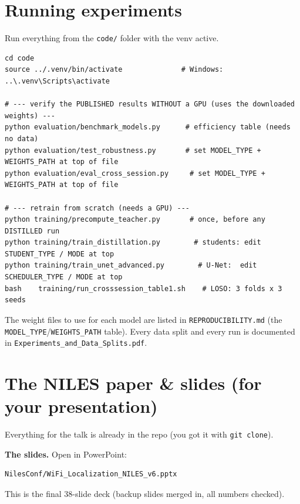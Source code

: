 \documentclass[11pt]{article}
\begin{document}
\section{Running experiments}
Run everything from the \texttt{code/} folder with the venv active.
\begin{lstlisting}
cd code
source ../.venv/bin/activate              # Windows: ..\.venv\Scripts\activate

# --- verify the PUBLISHED results WITHOUT a GPU (uses the downloaded weights) ---
python evaluation/benchmark_models.py      # efficiency table (needs no data)
python evaluation/test_robustness.py       # set MODEL_TYPE + WEIGHTS_PATH at top of file
python evaluation/eval_cross_session.py     # set MODEL_TYPE + WEIGHTS_PATH at top of file

# --- retrain from scratch (needs a GPU) ---
python training/precompute_teacher.py       # once, before any DISTILLED run
python training/train_distillation.py        # students: edit STUDENT_TYPE / MODE at top
python training/train_unet_advanced.py        # U-Net:  edit SCHEDULER_TYPE / MODE at top
bash    training/run_crosssession_table1.sh    # LOSO: 3 folds x 3 seeds
\end{lstlisting}
The weight files to use for each model are listed in \texttt{REPRODUCIBILITY.md}
(the \texttt{MODEL\_TYPE}/\texttt{WEIGHTS\_PATH} table). Every data split and every run
is documented in \texttt{Experiments\_and\_Data\_Splits.pdf}.

\section{The NILES paper \& slides (for your presentation)}
Everything for the talk is already in the repo (you got it with \texttt{git clone}).

\textbf{The slides.} Open in PowerPoint:
\begin{lstlisting}
NilesConf/WiFi_Localization_NILES_v6.pptx
\end{lstlisting}
This is the final 38-slide deck (backup slides merged in, all numbers checked).
\end{document}
